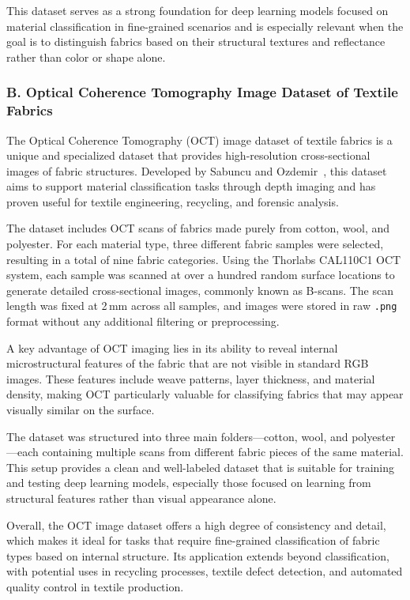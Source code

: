 This dataset serves as a strong foundation for deep learning models focused on material classification in fine-grained scenarios and is especially relevant when the goal is to distinguish fabrics based on their structural textures and reflectance rather than color or shape alone.

\subsubsection{B. Optical Coherence Tomography Image Dataset of Textile Fabrics}

The Optical Coherence Tomography (OCT) image dataset of textile fabrics is a unique and specialized dataset that provides high-resolution cross-sectional images of fabric structures. Developed by Sabuncu and Ozdemir~\cite{sabuncu2022optical}, this dataset aims to support material classification tasks through depth imaging and has proven useful for textile engineering, recycling, and forensic analysis.

The dataset includes OCT scans of fabrics made purely from cotton, wool, and polyester. For each material type, three different fabric samples were selected, resulting in a total of nine fabric categories. Using the Thorlabs CAL110C1 OCT system, each sample was scanned at over a hundred random surface locations to generate detailed cross-sectional images, commonly known as B-scans. The scan length was fixed at 2\,mm across all samples, and images were stored in raw \texttt{.png} format without any additional filtering or preprocessing.

A key advantage of OCT imaging lies in its ability to reveal internal microstructural features of the fabric that are not visible in standard RGB images. These features include weave patterns, layer thickness, and material density, making OCT particularly valuable for classifying fabrics that may appear visually similar on the surface.

The dataset was structured into three main folders—cotton, wool, and polyester—each containing multiple scans from different fabric pieces of the same material. This setup provides a clean and well-labeled dataset that is suitable for training and testing deep learning models, especially those focused on learning from structural features rather than visual appearance alone.

Overall, the OCT image dataset offers a high degree of consistency and detail, which makes it ideal for tasks that require fine-grained classification of fabric types based on internal structure. Its application extends beyond classification, with potential uses in recycling processes, textile defect detection, and automated quality control in textile production.

